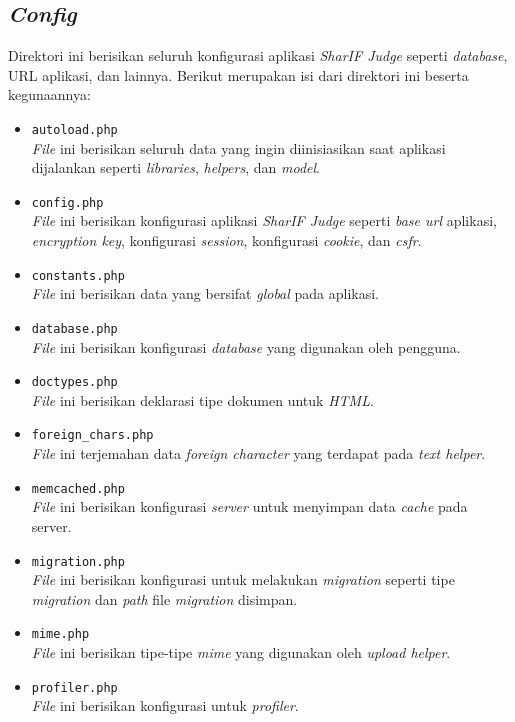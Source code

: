 \subsection{\textit{Config}}
Direktori ini berisikan seluruh konfigurasi aplikasi \textit{SharIF Judge} seperti \textit{database}, URL aplikasi, dan lainnya. Berikut merupakan isi dari direktori ini beserta kegunaannya:
\begin{itemize}
	\item \texttt{autoload.php} \\ \textit{File} ini berisikan seluruh data yang ingin diinisiasikan saat aplikasi dijalankan seperti \textit{libraries}, \textit{helpers}, dan \textit{model}.
	\item \texttt{config.php} \\ \textit{File} ini berisikan konfigurasi aplikasi \textit{SharIF Judge} seperti \textit{base url} aplikasi, \textit{encryption key}, konfigurasi \textit{session}, konfigurasi \textit{cookie}, dan \textit{csfr}.
	\item \texttt{constants.php} \\\textit{File} ini berisikan data yang bersifat \textit{global} pada aplikasi.
	\item \texttt{database.php} \\ \textit{File} ini berisikan konfigurasi \textit{database} yang digunakan oleh pengguna.
	\item \texttt{doctypes.php} \\ \textit{File} ini berisikan deklarasi tipe dokumen untuk \textit{HTML}.
	\item \texttt{foreign\_chars.php} \\ \textit{File} ini terjemahan data \textit{foreign character} yang terdapat pada \textit{text helper}.
	\item \texttt{memcached.php} \\ \textit{File} ini berisikan konfigurasi \textit{server} untuk menyimpan data \textit{cache} pada server.
	\item \texttt{migration.php} \\ \textit{File} ini berisikan konfigurasi untuk melakukan \textit{migration} seperti tipe \textit{migration} dan \textit{path} file \textit{migration} disimpan.
	\item \texttt{mime.php} \\ \textit{File} ini berisikan tipe-tipe \textit{mime} yang digunakan oleh \textit{upload helper}.
	\item \texttt{profiler.php} \\ \textit{File} ini berisikan konfigurasi untuk \textit{profiler}.

\end{itemize}
